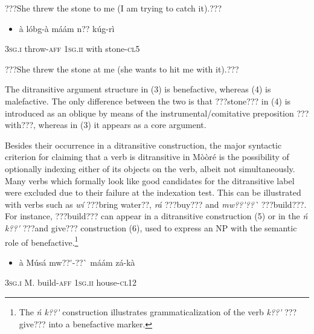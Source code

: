 \documentclass[output=paper]{langsci/langscibook}
\begin{document}
\begin{styleTranslation}
???She threw the stone to me (I am trying to catch it).???
\end{styleTranslation}

\begin{itemize}
\item \begin{styleNumberedEX}
\label{bkm:Ref446636099}\`{a}    l\'{o}bg-\`{a}    m\'{a}\'{a}m    n??  k\'{u}g-r\`{i}
\end{styleNumberedEX}\end{itemize}
\begin{styleGloss}
\textsc{3sg.i  }  throw-\textsc{aff}  \textsc{1sg.ii  }  with  stone-\textsc{cl5}
\end{styleGloss}

\begin{styleTranslation}
???She threw the stone at me (she wants to hit me with it).???
\end{styleTranslation}

The ditransitive argument structure in (3) is benefactive, whereas (4) is malefactive. The only difference between the two is that ???stone??? in (4) is introduced as an oblique by means of the instrumental/comitative preposition ???with???, whereas in (3) it appears as a core argument. 

Besides their occurrence in a ditransitive construction, the major syntactic criterion for claiming that a verb is ditransitive in M\`{o}\`{o}r\'{e} is the possibility of optionally indexing either of its objects on the verb, albeit not simultaneously. Many verbs which formally look like good candidates for the ditransitive label were excluded due to their failure at the indexation test. This can be illustrated with verbs such as \textit{w\'{i}} ???bring water??, \textit{r\'{a}} ???buy??? and \textit{mw??\'{ }??\`{ }} ???build???. For instance, ???build??? can appear in a ditransitive construction (5) or in the \textit{\'{n} k??\'{ }} ???and give??? construction (6), used to express an NP with the semantic role of benefactive.\footnote{ The\textit{ \'{n} k??\'{ }} construction illustrates grammaticalization of the verb \textit{k??\'{ }} ???give??? into a benefactive marker.} 

\begin{itemize}
\item \begin{styleNumberedEX}
\label{bkm:Ref446636172}\`{a}    M\'{u}s\'{a}  mw??\'{ }-??\`{ }    m\'{a}\'{a}m    z\'{a}-k\`{a}
\end{styleNumberedEX}\end{itemize}
\begin{styleGloss}
\textsc{3sg.i  }  M.  build-\textsc{aff}  \textsc{1sg.ii  }  house-\textsc{cl12}
\end{styleGloss}
\end{document}
